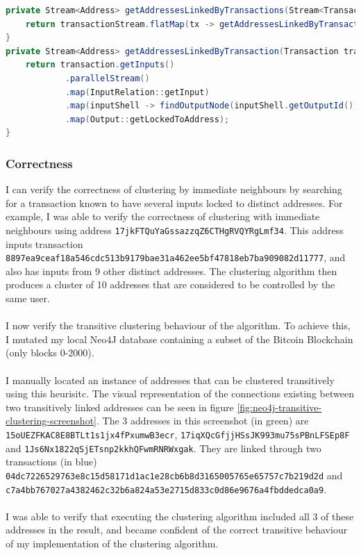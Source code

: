 \begin{lstlisting}[language=Java, caption={Java Implementation of on demand clustering}, label={lst:clustering-on-demand}, breaklines=true, basicstyle=\small]
private Stream<Address> getAddressesLinkedByTransactions(Stream<Transaction> transactionStream, Date start, Date end) {
    return transactionStream.flatMap(tx -> getAddressesLinkedByTransaction(tx, start, end));
}
private Stream<Address> getAddressesLinkedByTransaction(Transaction transaction, Date start, Date end) {
    return transaction.getInputs()
            .parallelStream()
            .map(InputRelation::getInput)
            .map(inputShell -> findOutputNode(inputShell.getOutputId(), start, end))
            .map(Output::getLockedToAddress);
}
\end{lstlisting}

\subsubsection{Correctness}


I can verify the correctness of clustering by immediate neighbours by searching for a transaction known to have several inputs locked to distinct addresses. For example, I was able to verify the correctness of clustering with immediate neighbours using address \texttt{17jkFTQuYaGssazzqZ6CTHgRVQYRgLmf34}. This address inputs transaction \\\texttt{8897ea9ceaf18a546cdc513b9179bae31a462ee5bf47818eb7ba909082d11777}, and also has inputs from 9 other distinct addresses. The clustering algorithm then produces a cluster of 10 addresses that are considered to be controlled by the same user. 
\\\\
I now verify the transitive clustering behaviour of the algorithm.  
To achieve this, I mutated my local Neo4J database containing a subset of the Bitcoin Blockchain (only blocks 0-2000). 
\\\\
I manually located an instance of addresses that can be clustered transitively using this heurisitc. The visual representation of the connections existing between two transitively linked addresses can be seen in figure \ref{fig:neo4j-transitive-clustering-screenshot}. The 3 addresses in this screenshot (in green) are \texttt{15oUEZFKAC8E8BTLt1s1jx4fPxumwB3ecr}, \texttt{17iqXQcGfjjHSsJK993mu75sPBnLFSEp8F} and \texttt{1Js6Nx1822qSjETsnp2kkhQFwmRNRWxgak}. They are linked through two transactions (in blue) \texttt{04dc7226529763e8c15d58171d1ac1e28cb6b8d3165005765e65757c7b219d2d} and \texttt{c7a4bb767027a4382462c32b6a824a53e2715d833c0d86e9676a4fbddedca0a9}. 
\\\\
I was able to verify that executing the clustering algorithm included all 3 of these addresses in the result, and became confident of the correct transitive behaviour of my implementation of the clustering algorithm. 

